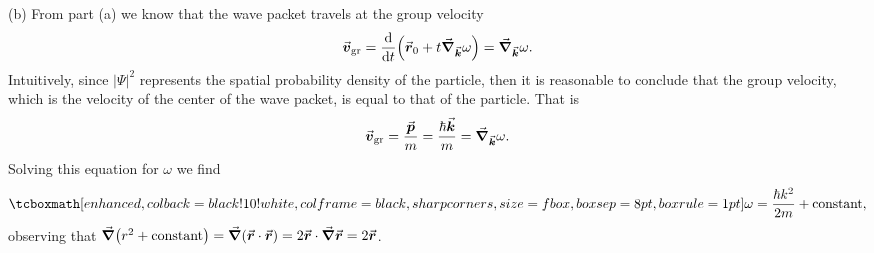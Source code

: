 {(b) From part (a) we know that the wave packet travels at the group velocity
\begin{eqnarray}
    \va*{v}_{\rm gr} = \dv{t} ( \va*{r}_{0} + t \grad_{\va*{k}} \omega ) = \grad_{\va*{k}} \omega
.\end{eqnarray}
Intuitively, since $|\Psi|^2$ represents the spatial probability density of the particle, then it is reasonable to conclude that the group velocity, which is the velocity of the center of the wave packet, is equal to that of the particle.
That is
\begin{eqnarray}
   \va*{v}_{\rm gr} = \frac{\va*{p}}{m} = \frac{\hbar \va*{k}}{m} = \grad_{\va*{k}} \omega
.\end{eqnarray}
Solving this equation for $\omega$ we find
\begin{eqnarray}
    \eqbox{ \omega = \frac{\hbar k^2}{2m} + {\rm constant} }
,\end{eqnarray}
observing that $\grad (r^2 + {\rm constant}) = \grad ( \va*{r} \cdot \va*{r} ) =  2 \va*{r} \cdot \grad \va*{r} = 2 \va*{r}$.

}




